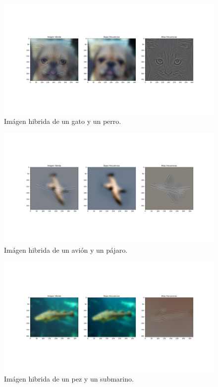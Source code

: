 \documentclass[12pt, spanish]{article}
\begin{document}
\begin{figure}[H]
  \centering
      \includegraphics[width=\textwidth]{hibridas_color/G-P.png}
 		 \caption{Imágen hibrida de un gato y un perro.}
  		\label{fig:ej2al}

\end{figure}


\begin{figure}[H]
  \centering
      \includegraphics[width=\textwidth]{hibridas_color/A-P.png}
 		 \caption{Imágen hibrida de un avión y un pájaro.}
  		\label{fig:ej2al}

\end{figure}

\begin{figure}[H]
  \centering
      \includegraphics[width=\textwidth]{hibridas_color/P-S.png}
 		 \caption{Imágen hibrida de un pez y un submarino.}
  		\label{fig:ej2al}

\end{figure}
\end{document}
